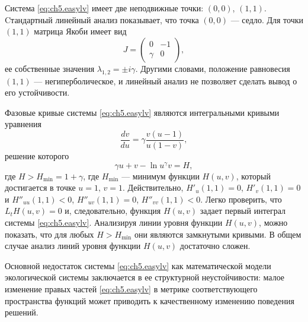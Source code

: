 Система \eqref{eq:ch5.easylv} имеет две неподвижные точки: $(0, 0)$, $(1, 1)$. Cтандартный линейный анализ показывает, что точка $(0, 0)$ --- седло. Для точки $(1, 1)$ матрица Якоби имеет
вид
$$
        J = \begin{pmatrix}
0      & -1 \\
\gamma &  0
        \end{pmatrix},
$$
ее собственные значения $\lambda_{1,2} = \pm i \gamma$. Другими словами, положение равновесия $(1, 1)$ --- негиперболическое, и линейный анализ не позволяет сделать вывод о его устойчивости.

Фазовые кривые системы \eqref{eq:ch5.easylv} являются интегральными кривыми уравнения
$$
        \frac{dv}{du} = \gamma\frac{v(u-1)}{u(1-v)},
$$
решение которого
\begin{equation}\label{eq:ch5.pi}
        \gamma u + v - \ln u^\gamma v = H,
\end{equation}
где $H > H_{\min} = 1 + \gamma$, где $H_{\min}$ --- минимум функции $H(u, v)$, который достигается в точке $u = 1,\,v = 1$. Действительно, $H'_u(1, 1) = 0$, $H'_v (1, 1) = 0$ и $H''_{uu} (1, 1) < 0$, $H''_{uv} (1, 1) = 0$, $H''_{vv} (1, 1) < 0$. Легко проверить, что $L_t H(u, v) = 0$ и, следовательно,
функция $H(u, v)$ задает первый интеграл системы \eqref{eq:ch5.easylv}. Анализируя линии уровня
функции $H(u, v)$, можно показать, что для любых $H > H_{\min}$ они являются замкнутыми кривыми. В общем случае анализ линий уровня функции $H(u, v)$
достаточно сложен.

Основной недостаток системы \eqref{eq:ch5.easylv} как математической модели экологической
системы заключается в ее структурной неустойчивости: малое изменение правых
частей \eqref{eq:ch5.easylv} в метрике соответствующего пространства функций может приводить к
качественному изменению поведения решений.


